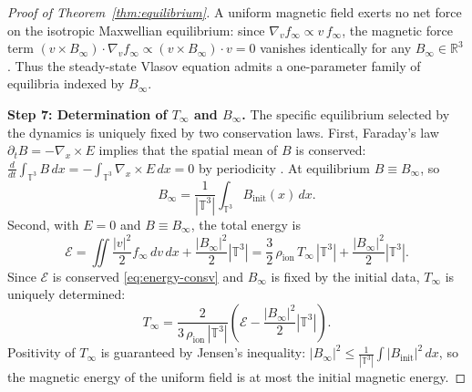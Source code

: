 \documentclass[]{article}
\newcommand{\R}{\mathbb{R}}
\numberwithin{equation}{section}
\begin{document}
\begin{proof}[Proof of Theorem~\ref{thm:equilibrium}]
A uniform magnetic field exerts no net force on the isotropic Maxwellian equilibrium: since $\nabla_v f_\infty \propto v \, f_\infty$, the magnetic force term $(v \times B_\infty) \cdot \nabla_v f_\infty \propto (v \times B_\infty) \cdot v = 0$ vanishes identically for any $B_\infty \in \R^3$.  Thus the steady-state Vlasov equation admits a one-parameter family of equilibria indexed by $B_\infty$.

\textbf{Step 7: Determination of $T_\infty$ and $B_\infty$.}
The specific equilibrium selected by the dynamics is uniquely fixed by two conservation laws.  First, Faraday's law $\partial_t B = -\nabla_x \times E$ implies that the spatial mean of $B$ is conserved: $\frac{d}{dt}\int_{\mathbb{T}^3} B \, dx = -\int_{\mathbb{T}^3} \nabla_x \times E \, dx = 0$ by periodicity \citep[cf.][p.~596]{guo2003vlasov}.  At equilibrium $B \equiv B_\infty$, so
\begin{equation}
\label{eq:B_conservation}
B_\infty = \frac{1}{|\mathbb{T}^3|}\int_{\mathbb{T}^3} B_{\mathrm{init}}(x) \, dx.
\end{equation}
Second, with $E = 0$ and $B \equiv B_\infty$, the total energy is
\[
\mathcal{E} = \iint \frac{|v|^2}{2} f_\infty \, dv \, dx + \frac{|B_\infty|^2}{2} |\mathbb{T}^3| = \frac{3}{2}\, \rho_{\mathrm{ion}} \, T_\infty \, |\mathbb{T}^3| + \frac{|B_\infty|^2}{2} |\mathbb{T}^3|.
\]
Since $\mathcal{E}$ is conserved \eqref{eq:energy-consv} and $B_\infty$ is fixed by the initial data, $T_\infty$ is uniquely determined:
\begin{equation}
\label{eq:T_infty}
T_\infty = \frac{2}{3\, \rho_{\mathrm{ion}} \, |\mathbb{T}^3|} \left(\mathcal{E} - \frac{|B_\infty|^2}{2} |\mathbb{T}^3|\right).
\end{equation}
Positivity of $T_\infty$ is guaranteed by Jensen's inequality: $|B_\infty|^2 \leq \frac{1}{|\mathbb{T}^3|}\int |B_{\mathrm{init}}|^2 \, dx$, so the magnetic energy of the uniform field is at most the initial magnetic energy. \qedhere
\end{proof}
\end{document}

